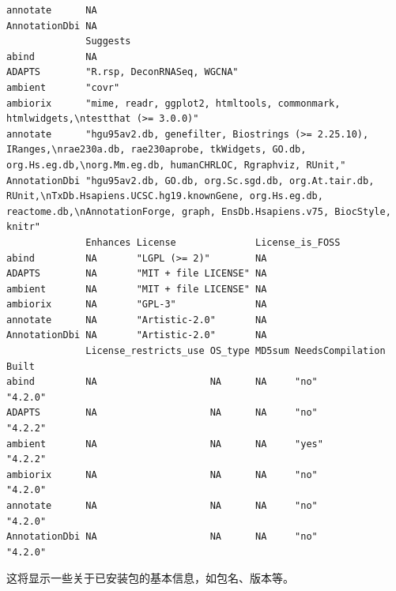 \documentclass[
  letterpaper,
  DIV=11,
  numbers=noendperiod]{scrreprt}
\begin{document}
\begin{verbatim}
annotate      NA                
AnnotationDbi NA                
              Suggests                                                                                                                                                                                
abind         NA                                                                                                                                                                                      
ADAPTS        "R.rsp, DeconRNASeq, WGCNA"                                                                                                                                                             
ambient       "covr"                                                                                                                                                                                  
ambiorix      "mime, readr, ggplot2, htmltools, commonmark, htmlwidgets,\ntestthat (>= 3.0.0)"                                                                                                        
annotate      "hgu95av2.db, genefilter, Biostrings (>= 2.25.10), IRanges,\nrae230a.db, rae230aprobe, tkWidgets, GO.db, org.Hs.eg.db,\norg.Mm.eg.db, humanCHRLOC, Rgraphviz, RUnit,"                   
AnnotationDbi "hgu95av2.db, GO.db, org.Sc.sgd.db, org.At.tair.db, RUnit,\nTxDb.Hsapiens.UCSC.hg19.knownGene, org.Hs.eg.db, reactome.db,\nAnnotationForge, graph, EnsDb.Hsapiens.v75, BiocStyle, knitr"
              Enhances License              License_is_FOSS
abind         NA       "LGPL (>= 2)"        NA             
ADAPTS        NA       "MIT + file LICENSE" NA             
ambient       NA       "MIT + file LICENSE" NA             
ambiorix      NA       "GPL-3"              NA             
annotate      NA       "Artistic-2.0"       NA             
AnnotationDbi NA       "Artistic-2.0"       NA             
              License_restricts_use OS_type MD5sum NeedsCompilation Built  
abind         NA                    NA      NA     "no"             "4.2.0"
ADAPTS        NA                    NA      NA     "no"             "4.2.2"
ambient       NA                    NA      NA     "yes"            "4.2.2"
ambiorix      NA                    NA      NA     "no"             "4.2.0"
annotate      NA                    NA      NA     "no"             "4.2.0"
AnnotationDbi NA                    NA      NA     "no"             "4.2.0"
\end{verbatim}

这将显示一些关于已安装包的基本信息，如包名、版本等。
\end{document}

